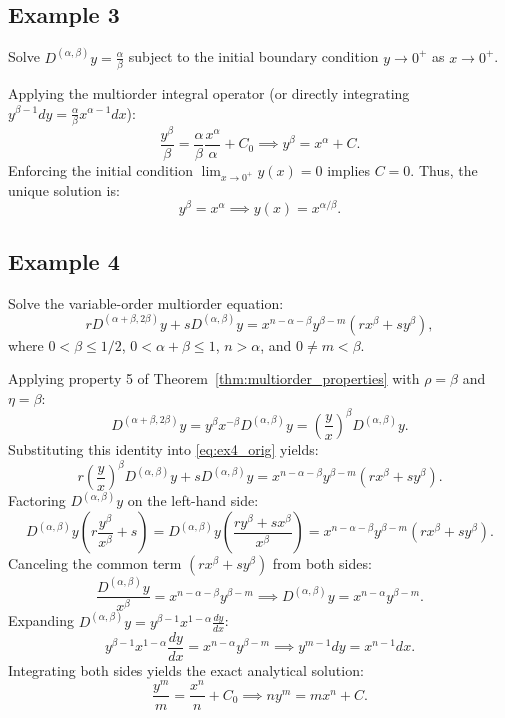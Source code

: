 \documentclass[oneside,10pt]{article}
\theoremstyle{plain}
\theoremstyle{definition}
\begin{document}
\subsection{Example 3}
Solve $D^{(\alpha,\beta)} y = \frac{\alpha}{\beta}$ subject to the initial boundary condition $y \to 0^+$ as $x \to 0^+$.

Applying the multiorder integral operator (or directly integrating $y^{\beta-1} d y = \frac{\alpha}{\beta} x^{\alpha-1} dx$):
\[
\frac{y^\beta}{\beta} = \frac{\alpha}{\beta} \frac{x^\alpha}{\alpha} + C_0 \implies y^\beta = x^\alpha + C.
\]
Enforcing the initial condition $\lim_{x \to 0^+} y(x) = 0$ implies $C = 0$. Thus, the unique solution is:
\[
y^\beta = x^\alpha \implies y(x) = x^{\alpha/\beta}.
\]

\subsection{Example 4}
Solve the variable-order multiorder equation:
\begin{equation}\label{eq:ex4_orig}
r D^{(\alpha+\beta, 2\beta)} y + s D^{(\alpha,\beta)} y = x^{n-\alpha-\beta} y^{\beta-m} \left( r x^\beta + s y^\beta \right),
\end{equation}
where $0 < \beta \le 1/2$, $0 < \alpha+\beta \le 1$, $n > \alpha$, and $0 \neq m < \beta$.

Applying property 5 of Theorem~\ref{thm:multiorder_properties} with $\rho = \beta$ and $\eta = \beta$:
\[
D^{(\alpha+\beta, 2\beta)} y = y^\beta x^{-\beta} D^{(\alpha,\beta)} y = \left(\frac{y}{x}\right)^\beta D^{(\alpha,\beta)} y.
\]
Substituting this identity into \eqref{eq:ex4_orig} yields:
\[
r \left(\frac{y}{x}\right)^\beta D^{(\alpha,\beta)} y + s D^{(\alpha,\beta)} y = x^{n-\alpha-\beta} y^{\beta-m} \left( r x^\beta + s y^\beta \right).
\]
Factoring $D^{(\alpha,\beta)} y$ on the left-hand side:
\[
D^{(\alpha,\beta)} y \left( r \frac{y^\beta}{x^\beta} + s \right) = D^{(\alpha,\beta)} y \left( \frac{r y^\beta + s x^\beta}{x^\beta} \right) = x^{n-\alpha-\beta} y^{\beta-m} \left( r x^\beta + s y^\beta \right).
\]
Canceling the common term $(r x^\beta + s y^\beta)$ from both sides:
\[
\frac{D^{(\alpha,\beta)} y}{x^\beta} = x^{n-\alpha-\beta} y^{\beta-m} \implies D^{(\alpha,\beta)} y = x^{n-\alpha} y^{\beta-m}.
\]
Expanding $D^{(\alpha,\beta)} y = y^{\beta-1} x^{1-\alpha} \frac{dy}{dx}$:
\[
y^{\beta-1} x^{1-\alpha} \frac{dy}{dx} = x^{n-\alpha} y^{\beta-m} \implies y^{m-1} dy = x^{n-1} dx.
\]
Integrating both sides yields the exact analytical solution:
\[
\frac{y^m}{m} = \frac{x^n}{n} + C_0 \implies n y^m = m x^n + C.
\]
\end{document}
